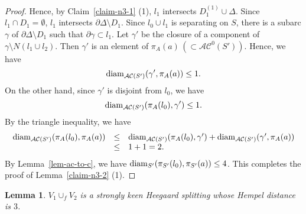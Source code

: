 \documentclass[]{aspm}
\newtheorem{lemma}[definition]{Lemma}
\begin{document}
\begin{proof}
Hence, by Claim~\ref{claim-n3-1} (1), $l_1$ intersects $D_1^{(1)}\cup \Delta$.
Since $l_1\cap D_1=\emptyset$, $l_1$ intersects $\partial\Delta\setminus D_1$.
Since $l_0\cup l_1$ is separating on $S$, there is a subarc $\gamma$ of $\partial\Delta\setminus D_1$ such that $\partial \gamma \subset l_1$.
Let $\gamma'$ be the closure of a component of $\gamma\setminus N(l_1\cup l_2)$.
Then $\gamma'$ is an element of $\pi_A(a)\,(\subset \mathcal{AC}^0(S'))$.
Hence, we have $${\rm diam}_{\mathcal{AC}(S')}(\gamma', \pi_{A}(a))\leq 1.$$
On the other hand, since $\gamma'$ is disjoint from $l_0$, we have $${\rm diam}_{\mathcal{AC}(S')}(\pi_{A}(l_0), \gamma')\leq 1.$$
By the triangle inequality, we have
\begin{eqnarray*}
\begin{array}{rcl}
{\rm diam}_{\mathcal{AC}(S')}(\pi_{A}(l_0), \pi_{A}(a))&\leq&
{\rm diam}_{\mathcal{AC}(S')}(\pi_{A}(l_0), \gamma')+{\rm diam}_{\mathcal{AC}(S')}(\gamma', \pi_{A}(a))\\
&\leq &1+1=2.
\end{array}
\end{eqnarray*}
By Lemma~\ref{lem-ac-to-c}, we have ${\rm diam}_{S'}(\pi_{S'}(l_0), \pi_{S'}(a))\leq 4$.
This completes the proof of Lemma~\ref{claim-n3-2} (1).
\end{proof}



\begin{lemma}\label{lem-n3}
$V_1\cup_f V_2$ is a strongly keen Heegaard splitting whose Hempel distance is $3$.
\end{lemma}
\end{document}
